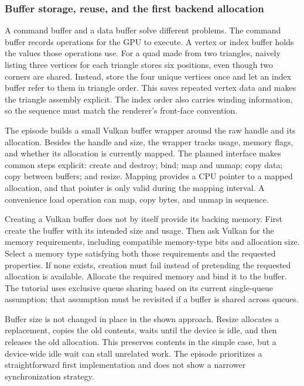 \subsubsection{Buffer storage, reuse, and the first backend allocation}\label{06-engine-ii-ch025-buffer-storage-reuse-and-the-first-backend-allocation}

A command buffer and a data buffer solve different problems. The command buffer records operations for the GPU to execute. A vertex or index buffer holds the values those operations use. For a quad made from two triangles, naively listing three vertices for each triangle stores six positions, even though two corners are shared. Instead, store the four unique vertices once and let an index buffer refer to them in triangle order. This saves repeated vertex data and makes the triangle assembly explicit. The index order also carries winding information, so the sequence must match the renderer's front-face convention.

The episode builds a small Vulkan buffer wrapper around the raw handle and its allocation. Besides the handle and size, the wrapper tracks usage, memory flags, and whether its allocation is currently mapped. The planned interface makes common steps explicit: create and destroy; bind; map and unmap; copy data; copy between buffers; and resize. Mapping provides a CPU pointer to a mapped allocation, and that pointer is only valid during the mapping interval. A convenience load operation can map, copy bytes, and unmap in sequence.

Creating a Vulkan buffer does not by itself provide its backing memory. First create the buffer with its intended size and usage. Then ask Vulkan for the memory requirements, including compatible memory-type bits and allocation size. Select a memory type satisfying both those requirements and the requested properties. If none exists, creation must fail instead of pretending the requested allocation is available. Allocate the required memory and bind it to the buffer. The tutorial uses exclusive queue sharing based on its current single-queue assumption; that assumption must be revisited if a buffer is shared across queues.

Buffer size is not changed in place in the shown approach. Resize allocates a replacement, copies the old contents, waits until the device is idle, and then releases the old allocation. This preserves contents in the simple case, but a device-wide idle wait can stall unrelated work. The episode prioritizes a straightforward first implementation and does not show a narrower synchronization strategy.

